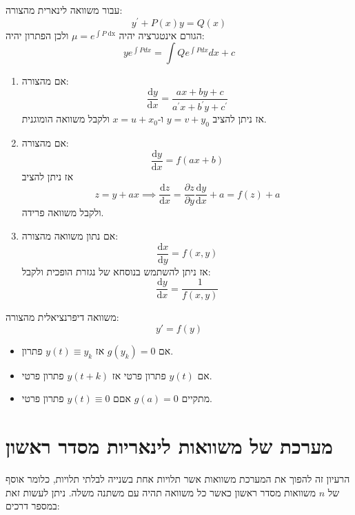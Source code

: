 \documentclass{tstextbook}
\begin{document}
\begin{proposition}
עבור משוואה לינארית מהצורה:
$$y^{\prime}+P(x)y=Q(x)$$
הגורם אינטגרציה יהיה \(\mu=e^{ \int P\;\mathrm{dx} }\) ולכן הפתרון יהיה:
$$y e^{\int P d x}=\int Q e^{\int P d x}d x+c$$

\end{proposition}
\begin{proposition}
  \begin{enumerate}
    \item אם מהצורה: 
$$\frac{\mathrm{d} y}{\mathrm{d} x} ={\frac{a x+b y+c}{a^{\prime}x+b^{\prime}y+c^{\prime}}}$$
אז ניתן להציב \(y=v+y_{0}\) ו-\(x=u+x_{0}\) ולקבל משוואה הומוגנית.


    \item אם מהצורה: 
$$\frac{\mathrm{d} y}{\mathrm{d} x}=f(ax+b)$$
אז ניתן להציב 
$$z=y+ax\implies \frac{\mathrm{d} z}{\mathrm{d} x} =\frac{\partial z}{\partial y} \frac{\mathrm{d} y}{\mathrm{d}x }+a=f(z)+a $$
ולקבל משוואה פרידה.


    \item אם נתון משוואה מהצורה: 
$$\frac{\mathrm{d} x}{\mathrm{d} y} =f(x,y)$$
אז ניתן להשתמש בנוסחא של נגזרת הופכית ולקבל:
$$\frac{\mathrm{d} y}{\mathrm{d} x} = \frac{1}{f(x,y)}$$


  \end{enumerate}
\end{proposition}
\begin{definition}
משוואה דיפרנציאלית מהצורה:
$$y'=f(y)$$

\end{definition}
\begin{proposition}
  \begin{itemize}
    \item אם \(g(y_k)=0\) אז \(y(t)\equiv y_k\) פתרון.
    \item אם \(y(t)\) פתרון פרטי אז \(y(t+k)\) פתרון פרטי.
    \item מתקיים \(g(a)=0\) אםם \(y(t)\equiv 0\) פתרון פרטי.
  \end{itemize}
\end{proposition}
\section{מערכת של משוואות לינאריות מסדר ראשון}

הרעיון זה להפוך את המערכת משוואות אשר תלויות אחת בשנייה לבלתי תלויות, כלומר אוסף של \(n\) משוואות מסדר ראשון כאשר כל משוואה תהיה עם משתנה משלה. ניתן לעשות זאת במספר דרכים:
\end{document}

